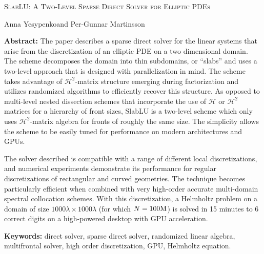 \documentclass[11pt]{amsart}
\newcommand{\lsp}{\vspace{3mm}}
\begin{document}
\begin{center}
\textsc{SlabLU: A Two-Level Sparse Direct Solver for Elliptic PDEs}

\lsp


Anna Yesypenko\footnotemark[1] and Per-Gunnar Martinsson\footnotemark[2]


\lsp

\begin{minipage}{130mm}
\small

\textbf{Abstract:} The paper describes a sparse direct solver for the linear systems that arise from the 
discretization of an elliptic PDE on a two dimensional domain. 
The scheme decomposes the domain into thin subdomains, or ``slabs'' and uses a two-level approach
that is designed with parallelization in mind. 
The scheme takes advantage of $\mathcal H^2$-matrix structure emerging during factorization and
utilizes randomized algorithms to efficiently recover this structure.
As opposed to multi-level nested dissection schemes that incorporate the use of 
$\mathcal H$ or $\mathcal H^2$ matrices for a hierarchy of front sizes, 
SlabLU is a two-level scheme which only uses $\mathcal H^2$-matrix algebra for fronts of roughly
the same size. 
The simplicity allows the scheme to be easily tuned for
performance on modern architectures and GPUs.

\lsp 

The solver described is compatible with a range of different local discretizations, 
and numerical experiments demonstrate its performance for regular discretizations of rectangular and curved geometries.
The technique becomes particularly efficient when combined with very high-order accurate multi-domain spectral collocation schemes. 
With this discretization, a Helmholtz problem on a domain of size 
$1000 \lambda \times 1000 \lambda$ (for which $N=100 \rm{M}$) is solved 
in 15 minutes to 6 correct digits on a high-powered desktop with GPU acceleration.

\lsp

\textbf{Keywords:} direct solver, sparse direct solver, randomized linear algebra, multifrontal solver, high order discretization, GPU, Helmholtz equation.
\end{minipage}

\end{center}
\end{document}
